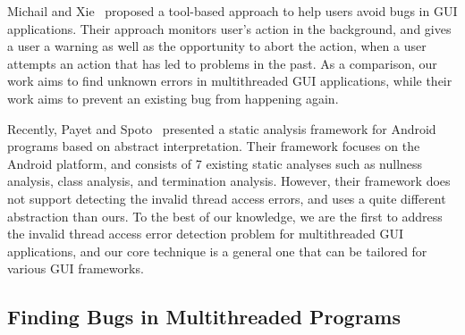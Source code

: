 Michail and Xie~\cite{michail05:helping} proposed a tool-based approach to help users avoid bugs
in GUI applications. Their approach monitors user's action in the background,
and gives a user a warning as well as the opportunity to abort the action, when
a user attempts an action that has led to problems in the past. 
As a comparison, our work aims to find unknown errors in multithreaded
GUI applications, while their work aims to prevent an existing bug
from happening again.


Recently, Payet and Spoto~\cite{Payet:2011:SAA:2032266.2032299} presented a static
analysis framework for Android programs based on  abstract
interpretation. Their framework focuses on the Android platform, and
 consists of 7 existing static analyses such as
nullness analysis, class analysis, and termination analysis.  However,
their framework does not support detecting the invalid thread access
errors, and uses a quite different abstraction than ours.
To the best of our knowledge, we are the first to address the invalid
thread access error detection problem for multithreaded GUI applications, and
our core technique is a general one that can be tailored for
various GUI frameworks.



\subsection{Finding Bugs in Multithreaded Programs}



